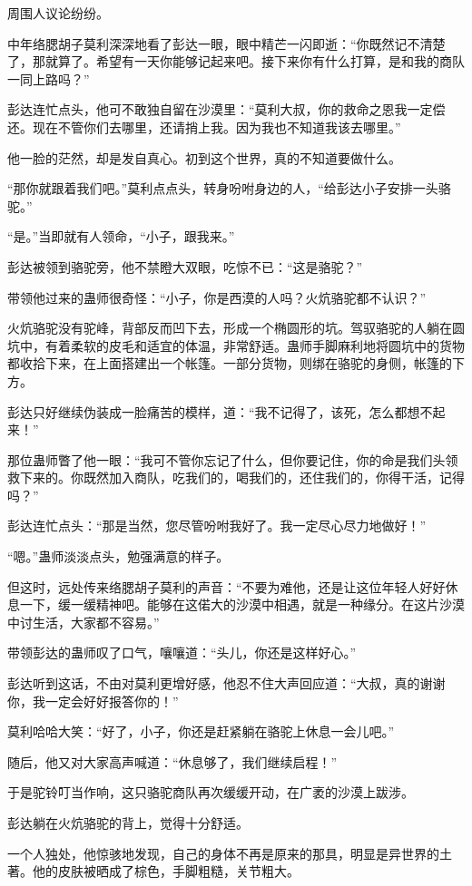 \begin{this_body}
周围人议论纷纷。

中年络腮胡子莫利深深地看了彭达一眼，眼中精芒一闪即逝：“你既然记不清楚了，那就算了。希望有一天你能够记起来吧。接下来你有什么打算，是和我的商队一同上路吗？”

彭达连忙点头，他可不敢独自留在沙漠里：“莫利大叔，你的救命之恩我一定偿还。现在不管你们去哪里，还请捎上我。因为我也不知道我该去哪里。”

他一脸的茫然，却是发自真心。初到这个世界，真的不知道要做什么。

“那你就跟着我们吧。”莫利点点头，转身吩咐身边的人，“给彭达小子安排一头骆驼。”

“是。”当即就有人领命，“小子，跟我来。”

彭达被领到骆驼旁，他不禁瞪大双眼，吃惊不已：“这是骆驼？”

带领他过来的蛊师很奇怪：“小子，你是西漠的人吗？火炕骆驼都不认识？”

火炕骆驼没有驼峰，背部反而凹下去，形成一个椭圆形的坑。驾驭骆驼的人躺在圆坑中，有着柔软的皮毛和适宜的体温，非常舒适。蛊师手脚麻利地将圆坑中的货物都收拾下来，在上面搭建出一个帐篷。一部分货物，则绑在骆驼的身侧，帐篷的下方。

彭达只好继续伪装成一脸痛苦的模样，道：“我不记得了，该死，怎么都想不起来！”

那位蛊师瞥了他一眼：“我可不管你忘记了什么，但你要记住，你的命是我们头领救下来的。你既然加入商队，吃我们的，喝我们的，还住我们的，你得干活，记得吗？”

彭达连忙点头：“那是当然，您尽管吩咐我好了。我一定尽心尽力地做好！”

“嗯。”蛊师淡淡点头，勉强满意的样子。

但这时，远处传来络腮胡子莫利的声音：“不要为难他，还是让这位年轻人好好休息一下，缓一缓精神吧。能够在这偌大的沙漠中相遇，就是一种缘分。在这片沙漠中讨生活，大家都不容易。”

带领彭达的蛊师叹了口气，嚷嚷道：“头儿，你还是这样好心。”

彭达听到这话，不由对莫利更增好感，他忍不住大声回应道：“大叔，真的谢谢你，我一定会好好报答你的！”

莫利哈哈大笑：“好了，小子，你还是赶紧躺在骆驼上休息一会儿吧。”

随后，他又对大家高声喊道：“休息够了，我们继续启程！”

于是驼铃叮当作响，这只骆驼商队再次缓缓开动，在广袤的沙漠上跋涉。

彭达躺在火炕骆驼的背上，觉得十分舒适。

一个人独处，他惊骇地发现，自己的身体不再是原来的那具，明显是异世界的土著。他的皮肤被晒成了棕色，手脚粗糙，关节粗大。


\end{this_body}
